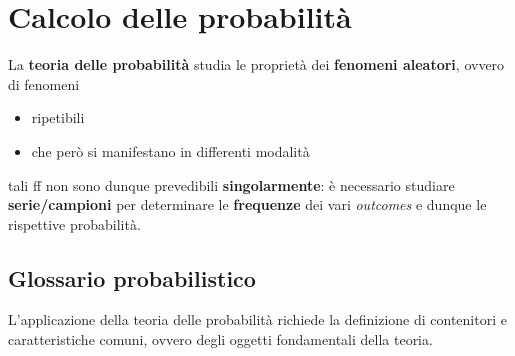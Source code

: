 \documentclass[10pt, oneside]{book}
\begin{document}
\chapter{Calcolo delle probabilità}
La \textbf{teoria delle probabilità} studia le proprietà dei \textbf{fenomeni aleatori}, ovvero di fenomeni
\begin{itemize}
\item ripetibili
\item che però si manifestano in differenti modalità
\end{itemize}
tali ff non sono dunque prevedibili \textbf{singolarmente}: è necessario studiare \textbf{serie/campioni} per determinare le \textbf{frequenze} dei vari \textit{outcomes} e dunque le rispettive probabilità.

\section{Glossario probabilistico}
L'applicazione della teoria delle probabilità richiede la definizione di contenitori e caratteristiche comuni, ovvero degli oggetti fondamentali della teoria.
\end{document}
